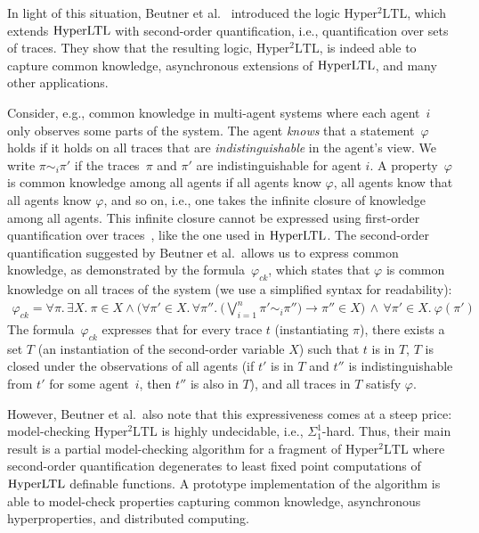 \documentclass[dvipsnames,10pt,a4paper]{amsart}
\theoremstyle{definition}
\theoremstyle{remark}
\newcommand{\hyltl}{\mathrm{Hyper\-LTL}\xspace}
\newcommand{\sohyltl}{\mathrm{Hyper^2LTL}\xspace}
\newcommand{\ck}{\mathit{ck}}
\begin{document}
In light of this situation, Beutner et al.~\cite{DBLP:conf/cav/BeutnerFFM23} introduced the logic $\sohyltl$, which extends $\hyltl$ with second-order quantification, i.e., quantification over sets of traces. 
They show that the resulting logic, $\sohyltl$, is indeed able to capture common knowledge, asynchronous extensions of $\hyltl$, and many other applications. 

Consider, e.g., common knowledge in multi-agent systems where each agent~$i$ only observes some parts of the system. The agent \emph{knows} that a statement~$\varphi$ holds if it holds on all traces that are \emph{indistinguishable} in the agent's view. 
We write $\pi \sim_i \pi'$ if the traces~$\pi$ and $\pi'$ are indistinguishable for agent $i$. 
A property~$\varphi$ is common knowledge among all agents if all agents know $\varphi$, all agents know that all agents know $\varphi$, and so on, i.e., one takes the infinite closure of knowledge among all agents. 
This infinite closure cannot be expressed using first-order quantification over traces~\cite{DBLP:conf/fossacs/BozzelliMP15}, like the one used in $\hyltl$. 
The second-order quantification suggested by Beutner et al.\ allows us to express common knowledge, as demonstrated by the formula~$\varphi_\ck$, which 
 states that $\varphi$ is common knowledge on all traces of the system (we use a simplified syntax for readability): 
\begin{align*}
   \varphi_\ck =  \forall \pi.\, \exists X .\ \pi \in X \land \Big( \forall \pi' \in X.\, \forall \pi''.\ \big(\bigvee\nolimits_{i=1}^n \pi' \sim_i \pi'' \big) \rightarrow \pi'' \in X \Big)\, \land\, \forall \pi' \in X.\ \varphi({\pi'})
\end{align*}
The formula~$\varphi_\ck$ expresses that for every trace $t$ (instantiating $\pi$), there exists a set $T$ (an instantiation of the second-order variable $X$) such that $t$ is in $T$, $T$ is closed under the observations of all agents (if $t'$ is in $T$ and $t''$ is indistinguishable from $t'$ for some agent~$i$, then $t''$ is also in $T$), and all traces in $T$ satisfy $\varphi$.  

However, Beutner et al.\ also note that this expressiveness comes at a steep price:
model-checking $\sohyltl$ is highly undecidable, i.e., $\Sigma_1^1$-hard.
Thus, their main result is a partial model-checking algorithm for a fragment of $\sohyltl$ where second-order quantification degenerates to least fixed point computations of $\hyltl$ definable functions. 
A prototype implementation of the algorithm is able to model-check properties capturing common knowledge, asynchronous hyperproperties, and distributed computing. %
\end{document}

